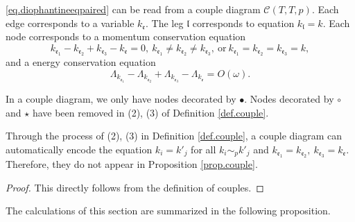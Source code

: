 \begin{prop}\label{prop.couple}
\eqref{eq.diophantineeqpaired} can be read from a couple diagram $\mathcal{C}(T,T,p)$. Each edge corresponds to a variable $k_{\mathfrak{e}}$. The leg $\mathfrak{l}$ corresponds to equation $k_{\mathfrak{l}}=k$. Each node corresponds to a momentum conservation equation
\begin{equation}
    k_{\mathfrak{e}_1}-k_{\mathfrak{e}_2}+k_{\mathfrak{e}_3}-k_{\mathfrak{e}}=0,\ k_{\mathfrak{e}_1}\ne k_{\mathfrak{e}_2}\ne k_{\mathfrak{e}_3},\ \text{or}\ k_{\mathfrak{e}_1}= k_{\mathfrak{e}_2}= k_{\mathfrak{e}_3}=k,
\end{equation} 
and a energy conservation equation 
\begin{equation}
    \Lambda_{k_{\mathfrak{e}_1}}-\Lambda_{k_{\mathfrak{e}_2}}+\Lambda_{k_{\mathfrak{e}_3}}-\Lambda_{k_{\mathfrak{e}}} = O(\omega).
\end{equation}  
\end{prop}
\begin{rem}
In a couple diagram, we only have nodes decorated by $\bullet$. Nodes decorated by $\circ$ and $\star$ have been removed in (2), (3) of Definition \ref{def.couple}.
\end{rem}
\begin{rem}
Through the process of (2), (3) in Definition \ref{def.couple}, a couple diagram can automatically encode the equation $k_{i}=k'_{j}$ for all $k_{i}\sim_{p}k'_{j}$ and $k_{\mathfrak{e}_1}=k_{\mathfrak{e}_2},\ k_{\mathfrak{e}_3}=k_{\mathfrak{e}}$. Therefore, they do not appear in Proposition \ref{prop.couple}.
\end{rem}

\begin{proof}
This directly follows from the definition of couples. 
\end{proof}

The calculations of this section are summarized in the following proposition. 

